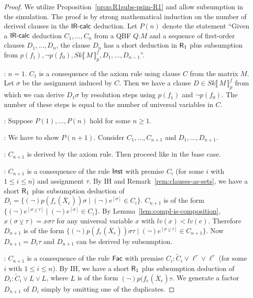 \documentclass{llncs}
\newcommand{\base}{{\sf Base}}
\newcommand{\ih}{{\sf IH}}
\newcommand{\step}{{\sf Step}}
\newcommand{\sccase}[1]{\noindent {\sc Case~#1}}
\newcommand{\Rfo}{$\mbox{\sf R}_1$}
\newcommand{\IRcalc}{$\mbox{\sf IR-calc}$}
\newcommand{\Fac}{$\mbox{\sf Fac}$}
\newcommand{\Inst}{$\mbox{\sf Inst}$}
\newcommand{\sequence}[1]{\overline{#1}}
\newcommand{\complassign}{\ensuremath{\veebar}}
\newcommand{\restrict}[1]{\ensuremath{[#1]}}
\newcommand{\SkQBFtoPL}[3]{\mathit{Sk}\llbracket\,#1\,\rrbracket_{#2}^{#3}}
\newcommand{\level}[1]{{\mathit lv(#1)}}
\begin{document}
\begin{proof}
We utilize Proposition~\ref{prop:R1subs-psim-R1} and allow subsumption
in the simulation.  The proof is by strong mathematical induction on
the number of derived clauses in the \IRcalc{} deduction. Let $P(n)$
denote the statement ``Given a \IRcalc{} deduction $C_1, \ldots , C_n$
from a QBF $Q.M$ and a sequence of first-order clauses $D_1, \ldots ,
D_n$, the clause $D_n$ has a short deduction in \Rfo{} plus
subsumption from $p(f_1), \neg p(f_0), \SkQBFtoPL{M}{p}{f}, D_1,
\ldots , D_{n-1}$''.

\medskip\noindent \base: $n=1$. $C_1$ is a consequence of the axiom
rule using clause $C$ from the matrix $M$. Let $\sigma$ be the
assignment induced by $C$. Then we have a clause $D\in
\SkQBFtoPL{M}{p}{f}$ from which we can derive $D_1\sigma$ by resolution
steps using $p(f_1)$ and $\neg p(f_0)$. The number of these steps is
equal to the number of universal variables in $C$.

\medskip\noindent \ih: Suppose $P(1), \ldots , P(n)$ hold for some
$n\geq 1$.

\medskip\noindent \step: We have to show $P(n+1)$. Consider $C_1,
\ldots , C_{n+1}$ and $D_1, \ldots , D_{n+1}$.

\medskip\noindent \sccase{1}: $C_{n+1}$ is derived by the axiom
rule. Then proceed like in the base case.

\medskip\noindent \sccase{2}: $C_{n+1}$ is a consequence of the
rule \Inst{} with premise $C_i$ (for some $i$ with $1\leq i\leq n$)
and assignment $\tau$. By \ih{} and Remark~\ref{rem:clauses-as-sets},
we have a short \Rfo{} plus subsumption deduction of $D_i = \{(\neg)
p(f_e(\sequence{X}_e)) \sigma \mid (\neg) e^{\restrict{\sigma}} \in
C_i\}$. $C_{n+1}$ is of the form $\{(\neg)
e^{\restrict{\sigma\complassign \tau}} \mid (\neg)
e^{\restrict{\sigma}} \in C_i\}$.  By
Lemma~\ref{lem:compl-is-composition}, $x(\sigma\complassign\tau) =
x\sigma\tau$ for any universal variable $x$ with
$\level{x}<\level{e}$. Therefore $D_{n+1}$ is of the form $\{(\neg)
p(f_e(\sequence{X}_e)) \sigma\tau \mid (\neg)
e^{\restrict{\sigma\complassign \tau}} \in C_{n+1}\}$. Now $D_{n+1} =
D_i\tau$ and $D_{n+1}$ can be derived by subsumption.

\medskip\noindent \sccase{3}: $C_{n+1}$ is a consequence of the
rule \Fac{} with premise $C_i: \widetilde{C}_i \lor \ell^{\tau} \lor
\ell^{\tau}$ (for some $i$ with $1\leq i\leq n$).  By \ih, we have a
short \Rfo{} plus subsumption deduction of $D_i\colon \widetilde{C}_i
\lor L \lor L$, where $L$ is of the form $(\neg)
p(f_e(\sequence{X}_e)\tau$. We generate a factor $D_{n+1}$ of $D_i$
  simply by omitting one of the duplicates. 


\end{proof}
\end{document}
